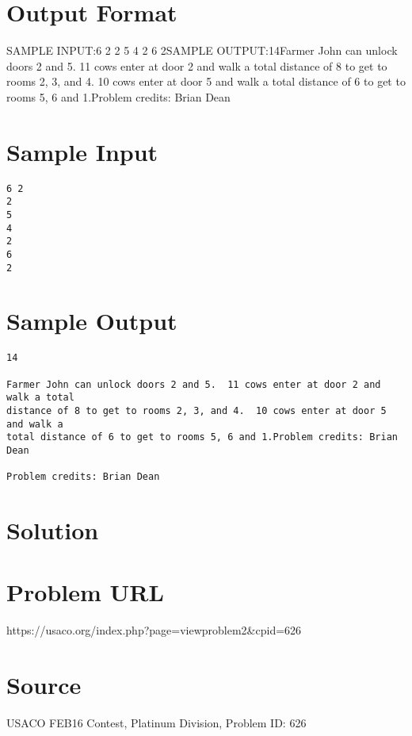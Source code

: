 \documentclass[12pt]{article}
\begin{document}
\section*{Output Format}
SAMPLE INPUT:6 2
2
5
4
2
6
2SAMPLE OUTPUT:14Farmer John can unlock doors 2 and 5.  11 cows enter at door 2 and walk a total
distance of 8 to get to rooms 2, 3, and 4.  10 cows enter at door 5 and walk a
total distance of 6 to get to rooms 5, 6 and 1.Problem credits: Brian Dean

\section*{Sample Input}
\begin{verbatim}
6 2
2
5
4
2
6
2
\end{verbatim}

\section*{Sample Output}
\begin{verbatim}
14

Farmer John can unlock doors 2 and 5.  11 cows enter at door 2 and walk a total
distance of 8 to get to rooms 2, 3, and 4.  10 cows enter at door 5 and walk a
total distance of 6 to get to rooms 5, 6 and 1.Problem credits: Brian Dean

Problem credits: Brian Dean
\end{verbatim}

\section*{Solution}


\section*{Problem URL}
https://usaco.org/index.php?page=viewproblem2&cpid=626

\section*{Source}
USACO FEB16 Contest, Platinum Division, Problem ID: 626
\end{document}
